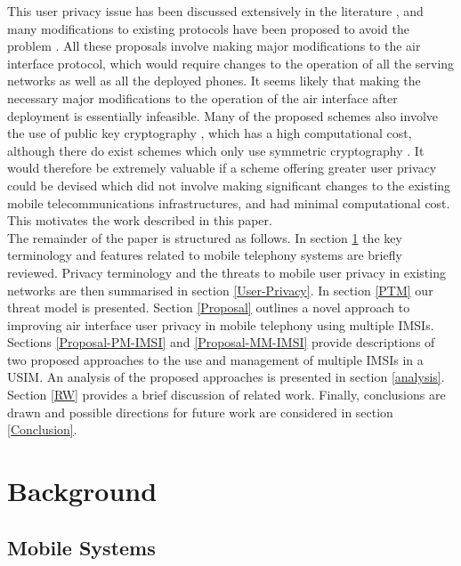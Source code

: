 \documentclass{acm_proc_article-sp}
\begin{document}
This user privacy issue has been discussed extensively in the literature \cite{Arapinis12,LTE-Identity-Privacy_Choudhury_2012,deng_2009_novel,Privacy-Khan-2014,koien_2013_privacy,LTE-AN_Vintila_2011,xiehua_2011_security}, and many modifications to existing protocols have been proposed to avoid the problem \cite{Arapinis12,deng_2009_novel,juang_2007_efficient_AKA,xiehua_2011_security}. All these proposals involve making major modifications to the air interface protocol, which would require changes to the operation of all the serving networks as well as all the deployed phones. It seems likely that making the necessary major modifications to the operation of the air interface after deployment is essentially infeasible.  Many of the proposed schemes also involve the use of public key cryptography \cite{Arapinis12,deng_2009_novel,xiehua_2011_security}, which has a high computational cost, although there do exist schemes which only use symmetric cryptography \cite{juang_2007_efficient_AKA}. It would therefore be extremely valuable if a scheme offering greater user privacy could be devised which did not involve making significant changes to the existing mobile telecommunications infrastructures, and had minimal computational cost. This motivates the work described in this paper. \\

The remainder of the paper is structured as follows. In
section \ref{BG} the key terminology and features related to mobile telephony systems are briefly reviewed. Privacy terminology and the threats to mobile user privacy in existing networks are then summarised in section \ref{User-Privacy}. In section \ref{PTM} our threat model is presented. Section \ref{Proposal} outlines a novel approach to improving air interface user privacy in mobile telephony using multiple IMSIs. Sections \ref{Proposal-PM-IMSI} and \ref{Proposal-MM-IMSI} provide descriptions of two proposed approaches to the use and management of multiple IMSIs in a USIM. An analysis of the proposed approaches is presented in section \ref{analysis}. Section \ref{RW} provides a brief discussion of related work. Finally, conclusions are drawn and possible directions for future work are considered in section \ref{Conclusion}.


\section{Background} \label{BG}

\subsection{Mobile Systems} \label{MS}
\end{document}
